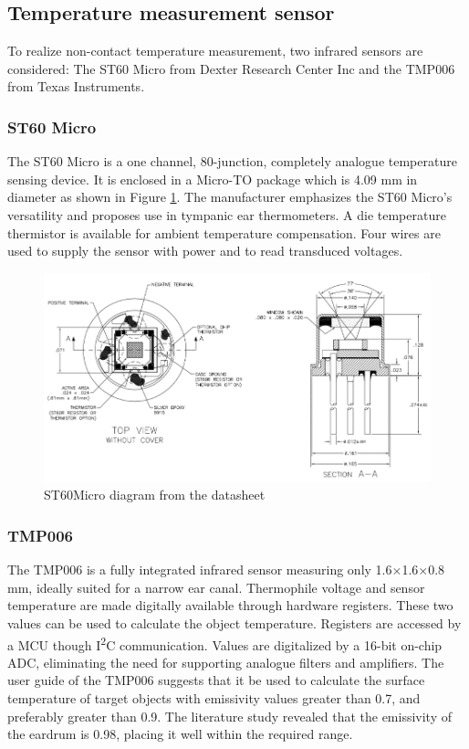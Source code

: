 \subsection{Temperature measurement sensor}
To realize non-contact temperature measurement, two infrared sensors are considered: The ST60 Micro from Dexter Research Center Inc and the TMP006 from Texas Instruments.


\subsubsection{ST60 Micro}
The ST60 Micro is a one channel, 80-junction, completely analogue temperature sensing device. It is enclosed in a Micro-TO package which is 4.09 mm in diameter as shown in Figure \ref{fig:ST60Micro}. The manufacturer emphasizes the ST60 Micro's versatility and proposes use in tympanic ear thermometers. A die temperature thermistor is available for ambient temperature compensation. Four wires are used to supply the sensor with power and to read transduced voltages.

 \begin{figure}[h]
   \centering
   \includegraphics[scale=1]{figs/ST60Micro.png}
   \caption{ST60Micro diagram from the datasheet}
   \label{fig:ST60Micro}
\end{figure}

\subsubsection{TMP006}
The TMP006 is a fully integrated infrared sensor measuring only 1.6$\times$1.6$\times$0.8 mm, ideally suited for a narrow ear canal. Thermophile voltage and sensor temperature are made digitally available through hardware registers. These two values can be used to calculate the object temperature. Registers are accessed by a MCU though I\textsuperscript{2}C communication. Values are digitalized by a 16-bit on-chip ADC, eliminating the need for supporting analogue filters and amplifiers. The user guide of the TMP006 suggests that it be used to calculate the surface temperature of target objects with emissivity values greater than 0.7, and preferably greater than 0.9. The literature study revealed that the emissivity of the eardrum is 0.98, placing it well within the required range.

